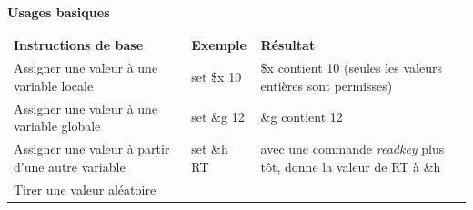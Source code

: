 \documentclass[
]{book}
\begin{document}
\textbf{Usages basiques}

\begin{longtable}[]{@{}lll@{}}
\toprule
\endhead
\begin{minipage}[t]{0.32\columnwidth}\raggedright
\textbf{Instructions de base}\strut
\end{minipage} & \begin{minipage}[t]{0.20\columnwidth}\raggedright
\textbf{Exemple}\strut
\end{minipage} & \begin{minipage}[t]{0.40\columnwidth}\raggedright
\textbf{Résultat}\strut
\end{minipage}\tabularnewline
\begin{minipage}[t]{0.32\columnwidth}\raggedright
Assigner une valeur à une variable locale\strut
\end{minipage} & \begin{minipage}[t]{0.20\columnwidth}\raggedright
set \$x 10\strut
\end{minipage} & \begin{minipage}[t]{0.40\columnwidth}\raggedright
\$x contient 10 (seules les valeurs entières sont permisses)\strut
\end{minipage}\tabularnewline
\begin{minipage}[t]{0.32\columnwidth}\raggedright
Assigner une valeur à une variable globale\strut
\end{minipage} & \begin{minipage}[t]{0.20\columnwidth}\raggedright
set \&g 12\strut
\end{minipage} & \begin{minipage}[t]{0.40\columnwidth}\raggedright
\&g contient 12\strut
\end{minipage}\tabularnewline
\begin{minipage}[t]{0.32\columnwidth}\raggedright
Assigner une valeur à partir d'une autre variable\strut
\end{minipage} & \begin{minipage}[t]{0.20\columnwidth}\raggedright
set \&h RT\strut
\end{minipage} & \begin{minipage}[t]{0.40\columnwidth}\raggedright
avec une commande \emph{readkey} plus tôt, donne la valeur de RT à \&h\strut
\end{minipage}\tabularnewline
\begin{minipage}[t]{0.32\columnwidth}\raggedright
Tirer une valeur aléatoire\strut
\end{minipage} & \begin{minipage}[t]{0.20\columnwidth}\raggedright

\end{minipage}
\end{longtable}
\end{document}
